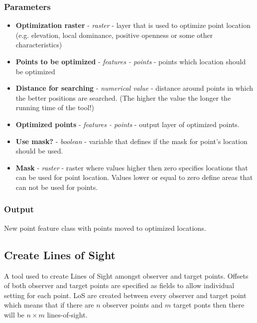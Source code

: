\documentclass[]{article}
\begin{document}
\subsubsection{Parameters}
\begin{itemize}
	\item \textbf{Optimization raster} - \textit{raster} - layer that is used to optimize point location (e.g. elevation, local dominance, positive openness or some other characteristics)
	\item \textbf{Points to be optimized} - \textit{features - points} - points which location should be optimized
	\item \textbf{Distance for searching} - \textit{numerical value} - distance around points in which the better positions are searched. (The higher the value the longer the running time of the tool!)
	\item \textbf{Optimized points} - \textit{features - points} - output layer of optimized points.
	\item \textbf{Use mask?} - \textit{boolean} - variable that defines if the mask for point's location should be used.
	\item \textbf{Mask} - \textit{raster} - raster where values higher then zero specifies locations that can be used for point location. Values lower or equal to zero define areas that can not be used for points.
\end{itemize}

\subsubsection{Output}

New point feature class with points moved to optimized locations.

\subsection{Create Lines of Sight}
\label{Sec:createLoS}
A tool used to create Lines of Sight amongst observer and target points. Offsets of both observer and target points are specified as fields to allow individual setting for each point. LoS are created between every observer and target point which means that if there are $n$ observer points and $m$ target ponts then there will be $n \times m$ lines-of-sight.
\end{document}

